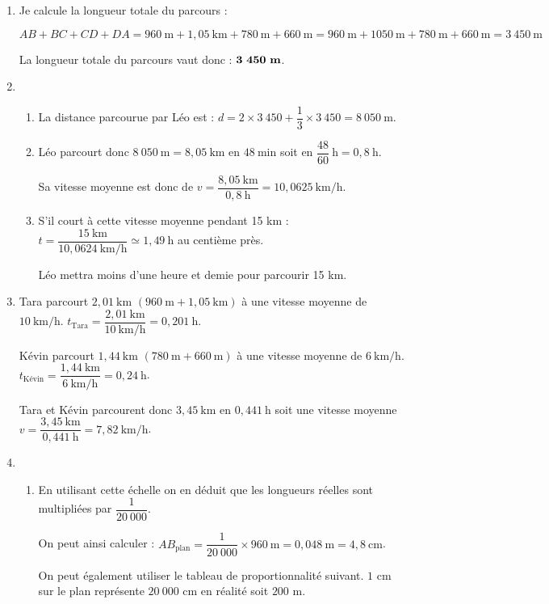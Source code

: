 \begin{enumerate}
\item Je calcule la longueur totale du parcours :

$AB + BC + CD + DA = 960~\text{m} + 1,05~\text{km} + 780~\text{m} + 660~\text{m} = 960~\text{m} + 1050~\text{m} + 780~\text{m} + 660~\text{m} = 3~450~\text{m}$

La longueur totale du parcours vaut donc : $\mathbf{3~450~\text{\textbf{m}}}$.
\item 
	\begin{enumerate}
		\item La distance parcourue par Léo est : $ d = 2 \times 3~450+\dfrac{1}{3}\times 3~450 = 8~050~\text{m}$.
		\item Léo parcourt donc $8~050~\text{m} = 8,05~\text{km}$ en $48~\text{min}$ soit en $\dfrac{48}{60}~\text{h} = 0,8~\text{h}$.
		
		Sa vitesse moyenne est donc de $v=\dfrac{8,05~\text{km}}{0,8~\text{h}}=10,0625~\text{km/h}$.
		\item S'il court à cette vitesse moyenne pendant 15 km : $t=\dfrac{15~\text{km}}{10,0624~\text{km/h}} \simeq 1,49~\text{h}$ au centième près.
		
		Léo mettra moins d’une heure et demie pour parcourir 15 km.
	\end{enumerate}
\item Tara parcourt $2,01~\text{km}$ $(960~\text{m} + 1,05~\text{km})$ à une vitesse moyenne de $10~\text{km/h}$. $t_{\text{Tara}}=\dfrac{2,01~\text{km}}{10~\text{km/h}}=0,201~\text{h}$.

Kévin parcourt $1,44~\text{km}$ $(780~\text{m} + 660~\text{m})$ à une vitesse moyenne de $6~\text{km/h}$.
$t_{\text{Kévin}}=\dfrac{1,44~\text{km}}{6~\text{km/h}}=0,24~\text{h}$.

Tara et Kévin parcourent donc $3,45~\text{km}$ en $0,441~\text{h}$ soit une vitesse moyenne
$v=\dfrac{3,45~\text{km}}{0,441~\text{h}}=7,82~\text{km/h}$.
\item 
	\begin{enumerate}
		\item En utilisant cette échelle on en déduit que les longueurs réelles sont multipliées par $\dfrac{1}{20~000}$.
		
		On peut ainsi calculer : $AB_{\text{plan}}= \dfrac{1}{20~000}\times 960~\text{m}=0,048~\text{m}=4,8~\text{cm}$.
		
		On peut également utiliser le tableau de proportionnalité suivant. $1$ cm sur le plan représente $20~000$ cm en réalité soit $200$ m.
		

\end{enumerate}
\end{enumerate}
